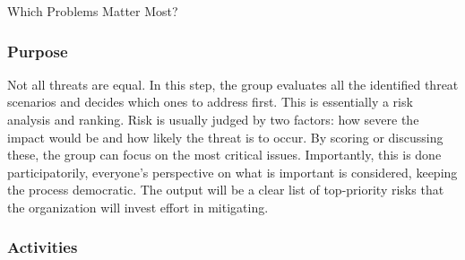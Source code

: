 Which Problems Matter Most?

\subsubsection{Purpose}

Not all threats are equal. In this step, the group evaluates all the
identified threat scenarios and decides which ones to address first. This is
essentially a risk analysis and ranking. Risk is usually judged by two factors:
how severe the impact would be and how likely the threat is to occur. By scoring
or discussing these, the group can focus on the most critical issues.
Importantly, this is done participatorily, everyone's perspective on what is
important is considered, keeping the process democratic. The output will be a
clear list of top-priority risks that the organization will invest effort in mitigating.

\subsubsection{Activities}

